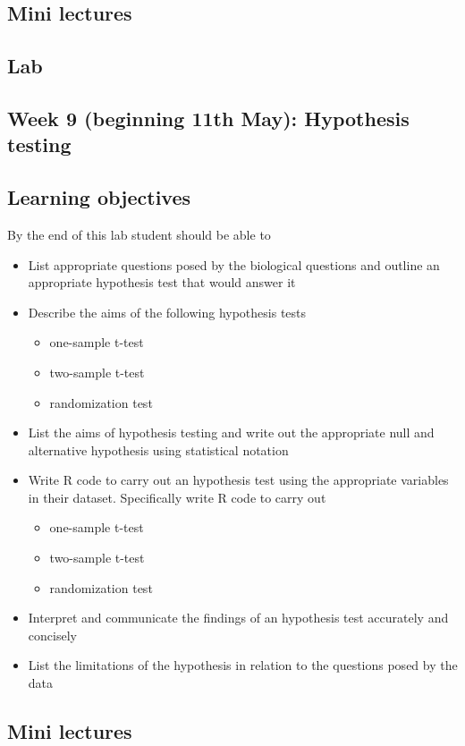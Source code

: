 \documentclass{article}
\begin{document}
\subsection*{Mini lectures}


\subsection*{Lab}

\subsection*{Week 9 (beginning 11th May): Hypothesis testing}
\subsection*{Learning objectives}
By the end of this lab student should be able to
\begin{itemize}
\item List appropriate questions posed by the biological questions and  outline an appropriate hypothesis test that would answer it
\item Describe the aims of the following hypothesis tests
  \begin{itemize}
  \item one-sample t-test
  \item two-sample t-test
  \item randomization test
  \end{itemize}
\item List the aims of hypothesis testing and write out the appropriate null and alternative hypothesis using statistical notation
\item Write R code to carry out an hypothesis test using the appropriate variables in their dataset. Specifically write R code to carry out
  \begin{itemize}
  \item one-sample t-test
  \item two-sample t-test
  \item randomization test
  \end{itemize}
\item Interpret and communicate the findings of an hypothesis test accurately and concisely
\item List the limitations of the hypothesis in relation to the questions posed by the data
\end{itemize}

\subsection*{Mini lectures}
\end{document}

